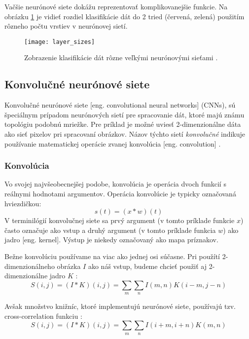 Vačšie neurónové siete dokážu reprezentovať komplikovanejšie funkcie.
Na obrázku \ref{pic:XNNLayerExample} je vidieť rozdiel klasifikácie dát do 2 tried (červená, zelená) použitím rôzneho počtu vrstiev v neurónovej sietí.
\begin{figure}[H]
	\centering
	\texttt{[image: layer\_sizes]}
	\caption{Zobrazenie klasifikácie dát rôzne veľkými neurónovými sieťami \cite{odkaz:ConvolutionalNeuralNetworkCS231n}.}
	\label{pic:XNNLayerExample}
\end{figure}

\subsection{Konvolučné neurónové siete}
\label{subsec:convolutionalneuralnetwork}
Konvolučné neurónové siete [eng. convolutional neural networks] (CNNs), sú špeciálnym prípadom neurónových sietí pre spracovanie
    dát, ktoré majú známu topológiu podobnú mriežke.
Pre príklad je možné uviesť 2-dimenzionálne dáta ako sieť pixelov pri spracovaní obrázkov.
Názov týchto sietí \textit{konvolučné} indikuje používanie matematickej operácie zvanej konvolúcia [eng. convolution] \cite{book:Goodfellow-et-al-2016}.

\subsubsection{Konvolúcia}
Vo svojej najvšeobecnejšej podobe, konvolúcia je operácia dvoch funkcií s reálnymi hodnotami argumentov.
Operácia konvolúcie je typicky označovaná hviezdičkou:
\begin{equation}
    s(t) = (x * w)(t)
\end{equation}
V terminilógií konvolučnej siete sa prvý argument (v tomto príklade funkcie $x$) často označuje ako vstup a druhý
    argument (v tomto príklade funkcia $w$) ako jadro [eng. kernel]. Výstup je niekedy označovaný ako mapa príznakov.

Bežne konvolúciu používame na viac ako jednej osi súčasne.
Pri použítí 2-dimenzionálneho obrázka $I$ ako náš vstup, budeme chcieť použiť aj 2-dimenzionálne jadro $K$ \cite{book:Goodfellow-et-al-2016}:
\begin{equation}
    S(i,j) = (I * K)(i, j) = \sum_m \sum_n I(m,n) K(i - m, j - n)
\end{equation}

Avšak množstvo knižníc, ktoré implementujú neurónové siete, používajú tzv. cross-correlation funkciu \cite{book:Goodfellow-et-al-2016}:
\begin{equation}
    S(i,j) = (I * K)(i, j) = \sum_m \sum_n I(i + m, i + n) K(m, n)
\end{equation}

